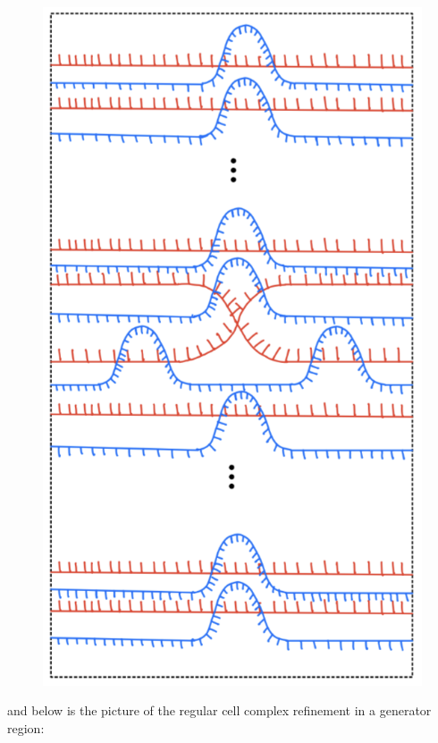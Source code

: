 \begin{definition}
\begin{figure}[H] 
    \centering
    \includegraphics[scale = 0.95]{diagrams/local_systems_on_as_diagrams/12.png} 
    \caption{}
    \label{fig:your-label}
\end{figure}

and below is the picture of the regular cell complex refinement in a generator region:


\end{definition}
